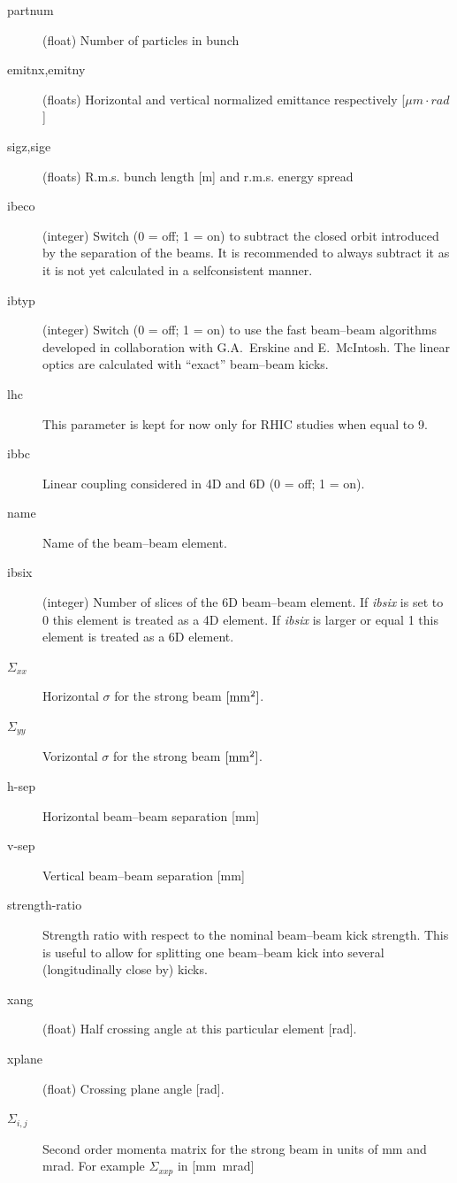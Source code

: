 \documentclass[a4paper,11pt]{report}
\begin{document}
\begin{description}
\item [partnum] (float) Number of particles in bunch
\item [emitnx,emitny] (floats) Horizontal and vertical normalized
  emittance respectively [$\mu m\cdot rad$]
\item [sigz,sige] (floats) R.m.s. bunch length [m] and r.m.s. energy
  spread
\item [ibeco] (integer) Switch (0 = off; 1 = on) to subtract the
  closed orbit introduced by the separation of the beams. It is
  recommended to always subtract it as it is not yet calculated in a
  selfconsistent manner.
\item [ibtyp] (integer) Switch (0 = off; 1 = on) to use the fast
  beam--beam algorithms developed in collaboration with G.A.~Erskine
  and E.~McIntosh.  The linear optics are calculated with ``exact''
  beam--beam kicks.
\item [lhc] This parameter is kept for now only for RHIC studies when equal to 9.
\item [ibbc] Linear coupling considered in 4D and 6D (0 = off; 1 = on).
\item [name] Name of the beam--beam element. 
\item [ibsix] (integer) Number of slices of the 6D beam--beam element.
  If {\it ibsix} is set to 0 this element is treated as a 4D element.
  If {\it ibsix} is larger or equal 1 this element is treated as a 6D element.
\item [$\Sigma_{xx}$] Horizontal $\sigma$ for the strong beam $\rm{[mm^2]}$.
\item [$\Sigma_{yy}$] Vorizontal $\sigma$ for the strong beam $\rm{[mm^2]}$.
\item [h-sep] Horizontal beam--beam separation [mm]
\item [v-sep] Vertical beam--beam separation [mm]
\item [strength-ratio] Strength ratio with respect to the nominal
      beam--beam kick strength. This is useful to
      allow for splitting one beam--beam kick into several (longitudinally
      close by) kicks.
\item [xang] (float) Half crossing angle at this particular element [rad].
\item [xplane] (float) Crossing plane angle [rad].
\item [$\Sigma_{i,j}$] Second order momenta matrix for the strong beam in units of mm and mrad. For example $\Sigma_{xxp}$ in [mm\ mrad]
\end{description}
\end{document}
